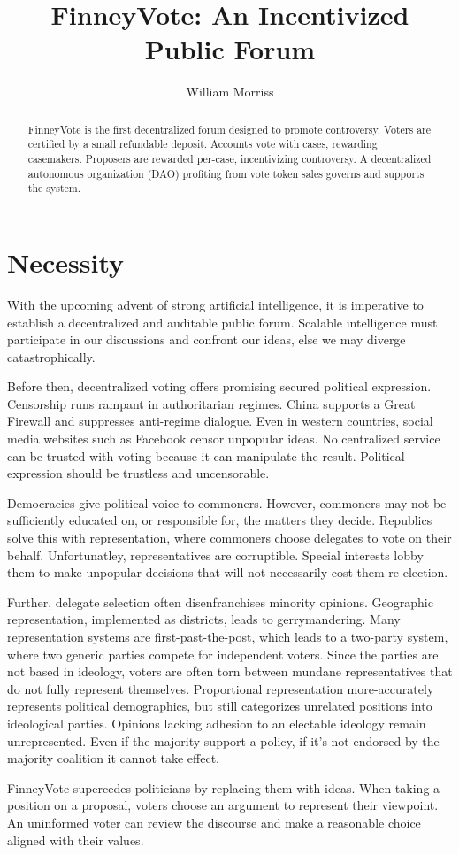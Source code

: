 \documentclass{article}
\title{FinneyVote: An Incentivized Public Forum}
\author{William Morriss}
\begin{document}
\maketitle
\begin{abstract}
FinneyVote is the first decentralized forum designed to promote controversy.
Voters are certified by a small refundable deposit.
Accounts vote with cases, rewarding casemakers.
Proposers are rewarded per-case, incentivizing controversy.
A decentralized autonomous organization (DAO) profiting from vote token sales governs and supports the system.
\end{abstract}
\section{Necessity}
With the upcoming advent of strong artificial intelligence, it is imperative to establish a decentralized and auditable public forum.
Scalable intelligence must participate in our discussions and confront our ideas, else we may diverge catastrophically.
\par
Before then, decentralized voting offers promising secured political expression.
Censorship runs rampant in authoritarian regimes.
China supports a Great Firewall and suppresses anti-regime dialogue.
Even in western countries, social media websites such as Facebook censor unpopular ideas.
No centralized service can be trusted with voting because it can manipulate the result.
Political expression should be trustless and uncensorable.
\par
Democracies give political voice to commoners.
However, commoners may not be sufficiently educated on, or responsible for, the matters they decide.
Republics solve this with representation, where commoners choose delegates to vote on their behalf.
Unfortunatley, representatives are corruptible.
Special interests lobby them to make unpopular decisions that will not necessarily cost them re-election.
\par
Further, delegate selection often disenfranchises minority opinions.
Geographic representation, implemented as districts, leads to gerrymandering.
Many representation systems are first-past-the-post, which leads to a two-party system, where two generic parties compete for independent voters.
Since the parties are not based in ideology, voters are often torn between mundane representatives that do not fully represent themselves.
Proportional representation more-accurately represents political demographics, but still categorizes unrelated positions into ideological parties.
Opinions lacking adhesion to an electable ideology remain unrepresented.
Even if the majority support a policy, if it's not endorsed by the majority coalition it cannot take effect.
\par
FinneyVote supercedes politicians by replacing them with ideas.
When taking a position on a proposal, voters choose an argument to represent their viewpoint.
An uninformed voter can review the discourse and make a reasonable choice aligned with their values.
\end{document}
